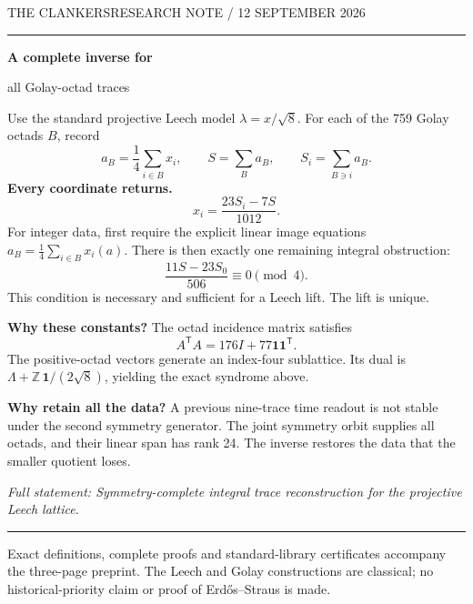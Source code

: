 \documentclass[12pt]{article}
\begin{document}
{\small THE CLANKERS\hfill RESEARCH NOTE / 12 SEPTEMBER 2026}\par\vspace{8pt}\hrule\vspace{15pt}

{\LARGE\bfseries A complete inverse for\par all Golay-octad traces}\par\vspace{8pt}
Use the standard projective Leech model $\lambda=x/\sqrt8$. For each of the 759 Golay octads $B$, record
\[
a_B=\frac14\sum_{i\in B}x_i,\qquad
S=\sum_Ba_B,\qquad S_i=\sum_{B\ni i}a_B.
\]
\textbf{Every coordinate returns.}
\[
\boxed{\displaystyle x_i=\frac{23S_i-7S}{1012}.}
\]
For integer data, first require the explicit linear image equations
$a_B=\frac14\sum_{i\in B}x_i(a)$. There is then exactly one remaining integral obstruction:
\[
\boxed{\displaystyle
\frac{11S-23S_0}{506}\equiv0\pmod4.}
\]
This condition is necessary and sufficient for a Leech lift. The lift is unique.

\textbf{Why these constants?} The octad incidence matrix satisfies
\[
A^{\mathsf T}A=176I+77\mathbf1\mathbf1^{\mathsf T}.
\]
The positive-octad vectors generate an index-four sublattice. Its dual is
$\Lambda+\mathbb Z\,\mathbf1/(2\sqrt8)$, yielding the exact syndrome above.

\textbf{Why retain all the data?} A previous nine-trace time readout is not stable under the second symmetry generator. The joint symmetry orbit supplies all octads, and their linear span has rank 24. The inverse restores the data that the smaller quotient loses.

\textit{Full statement: Symmetry-complete integral trace reconstruction for the projective Leech lattice.}
\vfill\hrule\vspace{6pt}
{\footnotesize Exact definitions, complete proofs and standard-library certificates accompany the three-page preprint. The Leech and Golay constructions are classical; no historical-priority claim or proof of Erd\H{o}s--Straus is made.}
\end{document}
